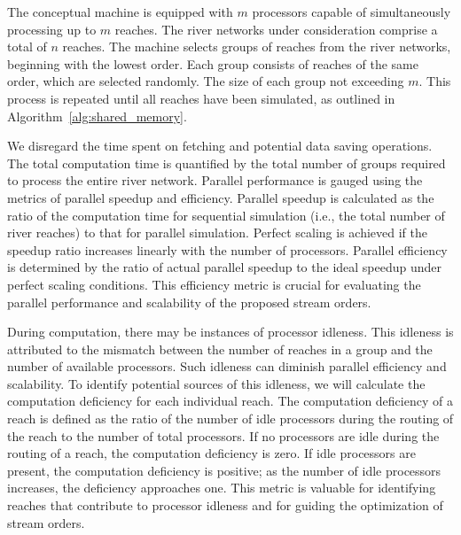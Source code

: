 \documentclass[water,article,submit,pdftex,moreauthors]{Definitions/mdpi}
\begin{document}
The conceptual machine is equipped with $m$ processors capable of simultaneously processing up to $m$ reaches. The river networks under consideration comprise a total of $n$ reaches. The machine selects groups of reaches from the river networks, beginning with the lowest order. Each group consists of reaches of the same order, which are selected randomly. The size of each group not exceeding $m$. This process is repeated until all reaches have been simulated, as outlined in Algorithm~\ref{alg:shared_memory}.

We disregard the time spent on fetching and potential data saving operations. The total computation time is quantified by the total number of groups required to process the entire river network. Parallel performance is gauged using the metrics of parallel speedup and efficiency. Parallel speedup is calculated as the ratio of the computation time for sequential simulation (i.e., the total number of river reaches) to that for parallel simulation. Perfect scaling is achieved if the speedup ratio increases linearly with the number of processors. Parallel efficiency is determined by the ratio of actual parallel speedup to the ideal speedup under perfect scaling conditions. This efficiency metric is crucial for evaluating the parallel performance and scalability of the proposed stream orders.

During computation, there may be instances of processor idleness. This idleness is attributed to the mismatch between the number of reaches in a group and the number of available processors. Such idleness can diminish parallel efficiency and scalability. To identify potential sources of this idleness, we will calculate the computation deficiency for each individual reach. The computation deficiency of a reach is defined as the ratio of the number of idle processors during the routing of the reach to the number of total processors. If no processors are idle during the routing of a reach, the computation deficiency is zero. If idle processors are present, the computation deficiency is positive; as the number of idle processors increases, the deficiency approaches one. This metric is valuable for identifying reaches that contribute to processor idleness and for guiding the optimization of stream orders.
\end{document}
